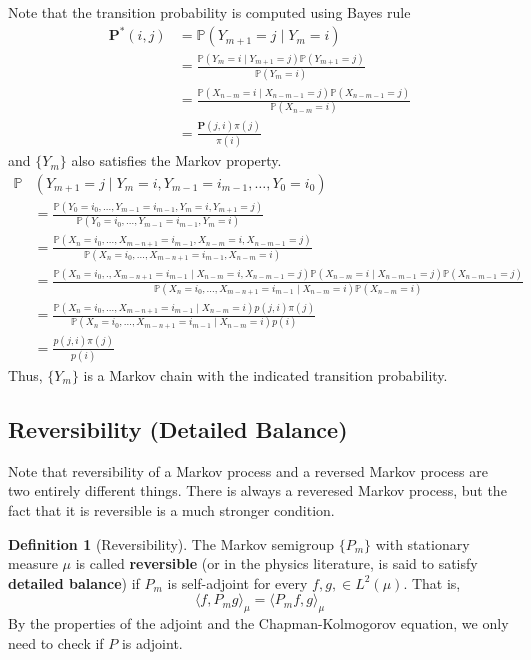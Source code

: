 \documentclass{article}
\theoremstyle{definition}
\theoremstyle{remark}
\theoremstyle{definition}
\newtheorem{definition}{Definition}[section]
\begin{document}
Note that the transition probability is computed using Bayes rule 
\begin{align*}
    \mathbf{P^*}(i, j) & = \mathbb{P}(Y_{m + 1} = j \mid Y_m = i) \\
    & = \frac{\mathbb{P}(Y_m = i \mid Y_{m+1} = j) \mathbb{P}(Y_{m+1} = j)}{\mathbb{P}(Y_m = i)} \\
    & = \frac{\mathbb{P}(X_{n-m} = i \mid X_{n-m-1} = j) \mathbb{P}(X_{n-m-1} = j)}{\mathbb{P}(X_{n-m} = i)} \\
    & = \frac{\mathbf{P}(j, i) \pi(j)}{\pi(i)}
\end{align*}
and $\{Y_m\}$ also satisfies the Markov property. 
\begin{align*}
    \mathbb{P}&(Y_{m+1} = j \mid Y_m = i, Y_{m-1} = i_{m-1}, \ldots, Y_0 = i_0) \\
    & = \frac{\mathbb{P}(Y_0 = i_0, \ldots, Y_{m-1} = i_{m-1}, Y_{m} = i, Y_{m+1} = j)}{\mathbb{P}(Y_0 = i_0, \ldots, Y_{m-1} = i_{m-1}, Y_{m} = i)} \\
    & = \frac{\mathbb{P}(X_n = i_0, \ldots, X_{m-n+1} = i_{m-1}, X_{n-m} = i, X_{n-m-1} = j)}{\mathbb{P}(X_n = i_0, \ldots, X_{m-n+1} = i_{m-1}, X_{n-m} = i)} \\
    & = \frac{\mathbb{P}(X_n = i_0, . , X_{m-n+1} = i_{m-1} \mid X_{n-m} = i, X_{n-m-1} = j) \mathbb{P}(X_{n-m} = i \mid X_{n-m-1} = j) \mathbb{P}(X_{n-m-1} = j)}{\mathbb{P}(X_n = i_0, \ldots, X_{m-n+1} = i_{m-1} \mid X_{n-m} = i) \mathbb{P}(X_{n-m} = i)} \\
    & = \frac{\mathbb{P}(X_n = i_0, \ldots, X_{m-n+1} = i_{m-1} \mid X_{n-m} = i) p(j, i) \pi(j)}{\mathbb{P}(X_n = i_0, \ldots, X_{m-n+1} = i_{m-1} \mid X_{n-m} = i) p(i)} \\
    & = \frac{p(j, i) \pi(j)}{p(i)}
\end{align*}
Thus, $\{Y_m\}$ is a Markov chain with the indicated transition probability. 


\subsection{Reversibility (Detailed Balance)}

Note that reversibility of a Markov process and a reversed Markov process are two entirely different things. There is always a reveresed Markov process, but the fact that it is reversible is a much stronger condition. 

\begin{definition}[Reversibility]
The Markov semigroup $\{P_m\}$ with stationary measure $\mu$ is called \textbf{reversible} (or in the physics literature, is said to satisfy \textbf{detailed balance}) if $P_m$ is self-adjoint for every $f, g, \in L^2 (\mu)$. That is, 
\[\langle f, P_m g \rangle_\mu = \langle P_m f, g \rangle_\mu\]
By the properties of the adjoint and the Chapman-Kolmogorov equation, we only need to check if $P$ is adjoint. 
\end{definition}
\end{document}
